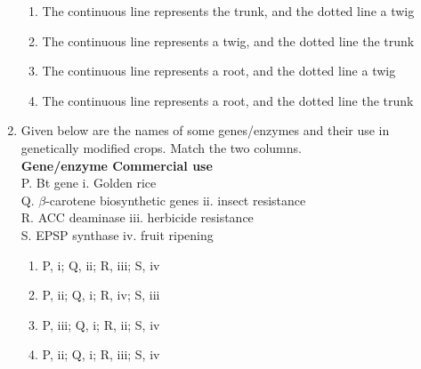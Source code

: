 \documentclass[journal,12pt,onecolumn]{IEEEtran}
\begin{document}
\begin{enumerate}[label=\arabic*.,resume]
\begin{enumerate}[label=(\Alph*)]
\item The continuous line represents the trunk, and the dotted line a twig
\item The continuous line represents a twig, and the dotted line the trunk
\item The continuous line represents a root, and the dotted line a twig
\item The continuous line represents a root, and the dotted line the trunk
\end{enumerate}

\item Given below are the names of some genes/enzymes and their use in genetically modified crops. Match the two columns. \\

\textbf{Gene/enzyme \hspace{2cm} Commercial use} \\
P. Bt gene \hspace{3.2cm} i. Golden rice \\
Q. $\beta$-carotene biosynthetic genes \hspace{0.7cm} ii. insect resistance \\
R. ACC deaminase \hspace{2cm} iii. herbicide resistance \\
S. EPSP synthase \hspace{2.1cm} iv. fruit ripening

\begin{multicols}{2}
\begin{enumerate}[label=(\Alph*)]
\item P, i; Q, ii; R, iii; S, iv
\item P, ii; Q, i; R, iv; S, iii
\item P, iii; Q, i; R, ii; S, iv
\item P, ii; Q, i; R, iii; S, iv
\end{enumerate}
\end{multicols}


\end{enumerate}
\end{document}
